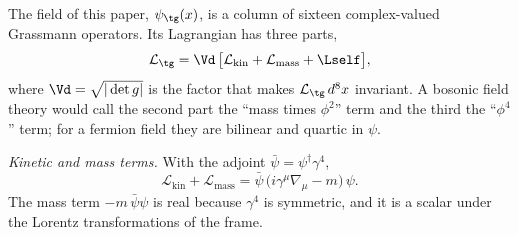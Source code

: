 The field of this paper, $\psi_{\tg}(x)$, is a column of sixteen complex-valued Grassmann operators.
Its Lagrangian has three parts,
\begin{equation}
\mathcal L_{\tg}=\Vd\,\big[\mathcal L_{\mathrm{kin}}+\mathcal L_{\mathrm{mass}}+\Lself\big],
\label{eq:Ltot}
\end{equation}
where $\Vd=\sqrt{|\det g|}$ is the factor that makes $\mathcal L_{\tg}\,d^{8}x$ invariant. A
bosonic field theory would call the second part the ``mass times $\phi^{2}$'' term and the third the
``$\phi^{4}$'' term; for a fermion field they are bilinear and quartic in $\psi$.

\emph{Kinetic and mass terms.} With the adjoint $\bar\psi=\psi^\dagger\gamma^{4}$,
\begin{equation}
\mathcal L_{\mathrm{kin}}+\mathcal L_{\mathrm{mass}}=\bar\psi\,\big(i\gamma^{\mu}\nabla_\mu-m\big)\,\psi .
\label{eq:Lfree}
\end{equation}
The mass term $-m\,\bar\psi\psi$ is real because $\gamma^{4}$ is symmetric, and it is a scalar under
the Lorentz transformations of the frame.

